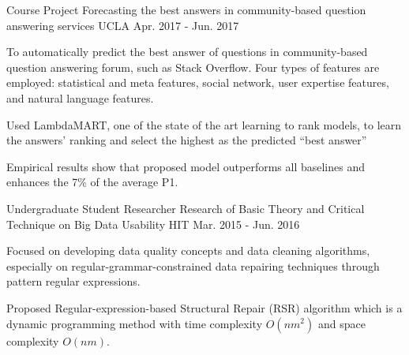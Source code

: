 \begin{cventries}
\cventry
	{Course Project}
	{Forecasting the best answers in community-based question answering services}
	{UCLA}
	{Apr. 2017 - Jun. 2017}
	{
		\begin{cvitems}
			\item {To automatically predict the best answer of questions in community-based question answering forum, such as Stack Overflow. Four types of features are employed: statistical and meta features, social network, user expertise features, and natural language features.}
			\item {Used LambdaMART, one of the state of the art learning to rank models, to learn the answers' ranking and select the highest as the predicted ``best answer''}
			\item {Empirical results show that proposed model outperforms all baselines and enhances the 7\% of the average P\@1.}
		\end{cvitems}
	}
\vspace{-1em}
  \cventry
    {Undergraduate Student Researcher}
    {Research of Basic Theory and Critical Technique on Big Data Usability}
    {HIT}
    {Mar. 2015 - Jun. 2016}
    {
      \begin{cvitems}
        \item{Focused on developing data quality concepts and data cleaning algorithms, especially on  regular-grammar-constrained data repairing techniques through pattern regular expressions.}
        \item{Proposed Regular-expression-based Structural Repair (RSR) algorithm which is a dynamic programming method with time complexity $O(nm^2)$ and space complexity $O(nm)$.}

\end{cvitems}}
\end{cventries}
